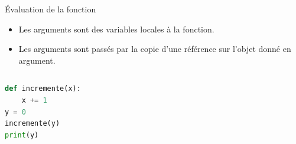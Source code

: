 \documentclass[10pt, xcolor={svgnames}]{beamer}
\begin{document}
\begin{frame}[fragile]{\'Evaluation de la fonction}
	\begin{block}{}
	\begin{itemize}
		\item Les arguments sont des variables locales à la fonction.
		\item Les arguments sont passés par la copie d'une référence sur l'objet
		donné en argument.
	\end{itemize}
		\end{block}
	\vspace{1 cm}
	
	\begin{columns}
		\column{6 cm}
		\begin{exampleblock}{}
			\begin{lstlisting}[language=Python]
def incremente(x):
	x += 1
y = 0
incremente(y)
print(y)
			\end{lstlisting}
		\end{exampleblock}
		
		\column{4 cm}
	\end{columns}
	
\end{frame}
\end{document}
